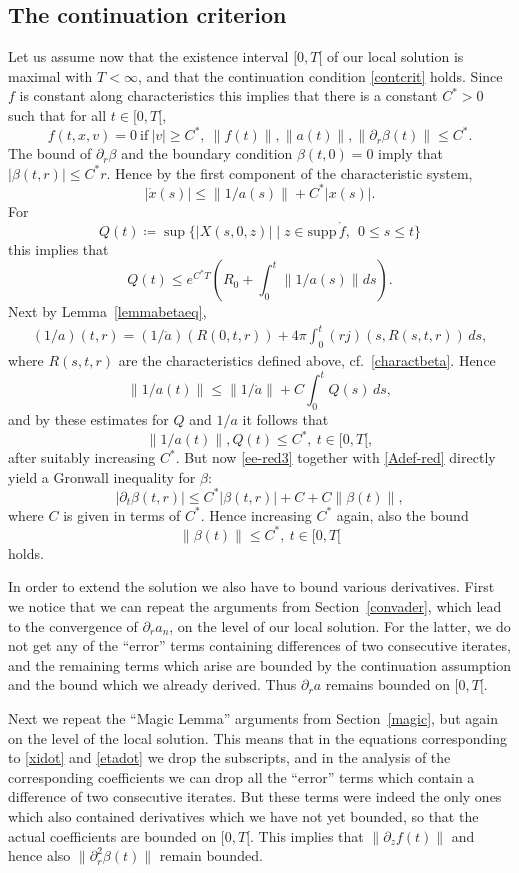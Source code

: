 \documentclass[11pt]{article}
\def\supp{\mathrm{supp}\,}
\begin{document}
\subsection{The continuation criterion}
%
%
Let us assume now that the existence interval $[0,T[$ of our local solution
is maximal with $T<\infty$,
and that the continuation condition \eqref{contcrit} holds.
Since $f$ is constant along characteristics this implies that there is a
constant $C^\ast >0$ such that for all $t\in[0,T[$,
\[
f(t,x,v) = 0 \ \mbox{if}\ |v| \geq C^\ast,\ \|f(t)\|, \|a(t)\|,
\|\partial_r \beta(t)\|
\leq C^\ast .
\]
The bound of $\partial_r \beta$ and the boundary condition
$\beta(t,0)=0$ imply that $|\beta(t,r)| \leq C^\ast r$.
Hence by the first component of the characteristic system,
\[
|\dot x(s)| \leq \|1/a(s)\| + C^\ast |x(s)|.
\]
For
\[
Q(t)\coloneqq \sup\{|X(s,0,z)| \mid z\in \supp \mathring{f},\ \ 0 \leq s\leq t\}
\]
this implies that
\[
Q(t) \leq e^{C^\ast T}\left(R_0 + \int_0^t \|1/a(s)\| ds\right).
\]
Next by Lemma~\ref{lemmabetaeq},
\begin{align}\label{1overa}
  (1/a)(t,r)=
  (1/\mathring{a})(R(0,t,r)) + 4\pi \int_0^t(r j)(s,R(s,t,r))\, ds,
\end{align}
where $R(s,t,r)$ are the characteristics defined above, cf.~\eqref{charactbeta}.
Hence
\[
\|1/a(t)\| \leq
\|1/\mathring{a}\| + C \int_0^t Q(s)\, ds, 
\]
and by these estimates for $Q$ and $1/a$ it follows that
\[
\|1/a(t)\|, Q(t) \leq C^\ast,\ t\in [0,T[,
\]
after suitably increasing $C^\ast$. But now \eqref{ee-red3} together
with \eqref{Adef-red} directly yield a Gronwall inequality for $\beta$:
\[
|\partial_t\beta (t,r)| \leq C^\ast |\beta(t,r)| + C + C \|\beta(t)\|,
\]
where $C$ is given in terms of $C^\ast$. Hence 
increasing $C^\ast$ again, also the bound
\[
\|\beta(t)\| \leq C^\ast,\ t\in [0,T[
\]
holds.

In order to extend the solution we also have to bound various derivatives.
First we notice that we can repeat the
arguments from Section~\ref{convader},
which lead to the convergence of $\partial_r a_n$,
on the level of our local solution. For the latter,
we do not get any of the ``error''
terms containing differences of two consecutive iterates,
and the remaining terms
which arise are bounded by the continuation assumption and
the bound which we already
derived. Thus $\partial_r a$ remains bounded on $[0,T[$.

Next we repeat the ``Magic Lemma'' arguments from Section~\ref{magic},
but again on the level
of the local solution. This means that in the equations corresponding to
\eqref{xidot} and \eqref{etadot} we drop the subscripts,
and in the analysis of the
corresponding coefficients we can drop all the ``error'' terms which contain
a difference of two consecutive iterates.
But these terms were indeed the only ones
which also contained derivatives which we have not yet bounded,
so that the actual
coefficients are bounded on $[0,T[$. This implies that $\|\partial_z f(t)\|$
and hence also $\|\partial_r^2 \beta(t)\|$ remain bounded.
\end{document}
